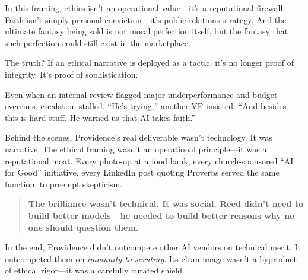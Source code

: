\begin{tcolorbox}[colback=blue!5!white, colframe=blue!50!black, breakable, title={Psychological Sidebar: Law 32 --- Play to people's fantasies}]
In this framing, ethics isn’t an operational value—it’s a reputational firewall. Faith isn’t simply personal conviction—it’s public relations strategy. And the ultimate fantasy being sold is not moral perfection itself, but the fantasy that such perfection could still exist in the marketplace.

\medskip

The truth? If an ethical narrative is deployed as a tactic, it’s no longer proof of integrity. It’s proof of sophistication.

\end{tcolorbox}






Even when an internal review flagged major underperformance and budget overruns, escalation stalled. “He’s trying,” another VP insisted. “And besides—this is hard stuff. He warned us that AI takes faith.”

Behind the scenes, Providence’s real deliverable wasn’t technology. It was narrative. The ethical framing wasn’t an operational principle—it was a reputational moat. Every photo-op at a food bank, every church-sponsored “AI for Good” initiative, every LinkedIn post quoting Proverbs served the same function: to preempt skepticism.

\begin{quote}
\textbf{The brilliance wasn’t technical. It was social. Reed didn’t need to build better models—he needed to build better reasons why no one should question them.}
\end{quote}

In the end, Providence didn’t outcompete other AI vendors on technical merit. It outcompeted them on \textit{immunity to scrutiny}. Its clean image wasn’t a byproduct of ethical rigor—it was a carefully curated shield.

